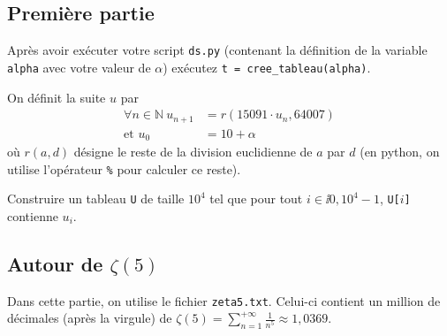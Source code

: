 \subsection*{Première partie}


Après avoir exécuter votre script \texttt{ds.py} (contenant la définition de la variable \texttt{alpha} avec votre valeur de $\alpha$)  exécutez \texttt{t = cree\_tableau(alpha)}.






On définit la suite $u$ par
\begin{align*}
\forall n\in \mathbb{N} \ u_{n+1} &= r(15091\cdot u_{n},64007)\\
\text{et }  u_{0} & = 10 + \alpha
\end{align*}
où $r(a,d)$ désigne le reste de la division euclidienne de $a$ par
$d$ (en python, on utilise l'opérateur \texttt{\%} pour calculer ce reste).

Construire un tableau \texttt{U} de taille $10^{4}$ tel que pour tout $i\in
\ii{0,10^{4}-1}$, \texttt{U[$i$]} contienne $u_{i}$.






\subsection{Autour de $\zeta(5)$}

Dans cette partie, on utilise le fichier \texttt{zeta5.txt}. Celui-ci
contient un million de décimales (après la virgule) de $\zeta(5) =
\sum_{n=1}^{+\infty} \frac{1}{n^{5}} \approx 1,0369$.

